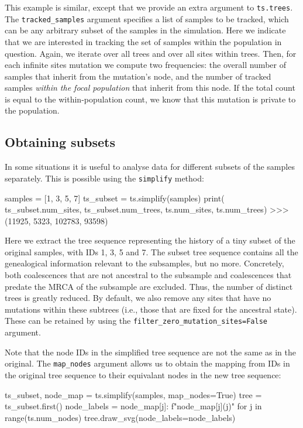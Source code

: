 \documentclass[graybox]{svmult}
\begin{document}
    This example is similar, except that we provide an extra argument to
\texttt{ts.trees}. The \texttt{tracked\_samples} argument specifies a list of samples to be tracked, which can be
any arbitrary subset of the samples in the simulation. Here we indicate
that we are interested in tracking the set of samples within the
population in question. Again, we iterate over all trees and over all
sites within trees. Then, for each infinite sites mutation we
compute two frequencies: the overall number of samples that inherit from
the mutation's node, and the number of tracked samples \emph{within the focal
population} that inherit from this node. If the total count is
equal to the within-population count, we know that this mutation is private to the population.

\subsection{Obtaining subsets}\label{obtaining-subsets}

In some situations it is useful to analyse data for different subsets of
the samples separately. This is possible using the \texttt{simplify}
method:

\begin{pythoncode}
samples = [1, 3, 5, 7]
ts_subset = ts.simplify(samples)
print(
    ts_subset.num_sites, ts_subset.num_trees,
    ts.num_sites, ts.num_trees)
>>> (11925, 5323, 102783, 93598)
\end{pythoncode}

Here we extract the tree sequence representing the history of a tiny
subset of the original samples, with IDs 1, 3, 5 and 7. The subset tree
sequence contains all the genealogical information relevant to the
subsamples, but no more. Concretely, both coalescences that are not ancestral to the
subsample and coalescences that predate
the MRCA of the subsample are excluded. Thus, the number of distinct trees is greatly
reduced. By default, we also remove any sites that have no mutations
within these subtrees (i.e., those that are fixed for the ancestral
state). These can be retained by using the
\texttt{filter\_zero\_mutation\_sites=False} argument.

Note that the node IDs in the simplified tree sequence are not the same as in the
original. The \texttt{map\_nodes} argument allows us to obtain the
mapping from IDs in the original tree sequence to their equivalant nodes
in the new tree sequence:

\begin{pythoncode}
ts_subset, node_map = ts.simplify(samples, map_nodes=True)
tree = ts_subset.first()
node_labels = {
    node_map[j]: f"{node_map[j]}({j})"
    for j in range(ts.num_nodes)}
tree.draw_svg(node_labels=node_labels)
\end{pythoncode}
\end{document}
